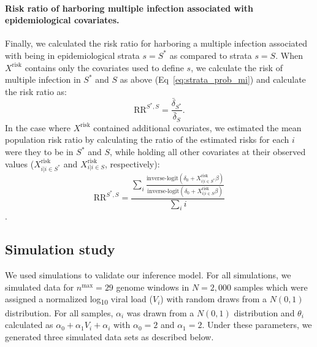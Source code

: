 \documentclass[10pt,letterpaper]{article}
\begin{document}
\paragraph{Risk ratio of harboring multiple infection associated with epidemiological covariates.} Finally, we calculated the risk ratio for harboring a multiple infection associated with being in epidemiological strata $s=S^*$ as compared to strata $s=S$. When $X^\text{risk}$ contains only the covariates used to define $s$, we calculate the risk of multiple infection in $S^*$ and $S$ as above (Eq~\ref{eq:strata_prob_mi}) and calculate the risk ratio as: 
\begin{equation}
    \text{RR}^{S^*,S} = \frac{\bar{\delta}_{S^*}}{\bar{\delta}_{S}}.
\end{equation}
In the case where $X^\text{risk}$ contained additional covariates, we estimated the mean population risk ratio by calculating the ratio of the estimated risks for each $i$ were they to be in $S^*$ and $S$, while holding all other covariates at their observed values ($X^\text{risk}_{i | i \in S^*}$ and $X^\text{risk}_{i | i \in S}$, respectively): 
\begin{equation}
    \text{RR}^{S^*,S} = \frac{\sum_i \frac{\text{inverse-logit} \left( \delta_0 + X^\text{risk}_{i | i \in S^*} \beta \right )}{\text{inverse-logit} \left( \delta_0 + X^\text{risk}_{i | i \in S} \beta \right )}}{\sum_i i}
\end{equation}.

\subsection{Simulation study}
We used simulations to validate our inference model. For all simulations, we simulated data for ${n^{\text{max}}} = 29$ genome windows in $N = 2,000$ samples which were assigned a normalized log\textsubscript{10} viral load ($V_i$) with random draws from a $N(0,1)$ distribution. For all samples, $\alpha_i$ was drawn from a $N(0,1)$ distribution and $\theta_i$ calculated as $\alpha_0 + \alpha_1 V_i + \alpha_i$ with $\alpha_0 = 2$ and $\alpha_1 = 2$. Under these parameters, we generated three simulated data sets as described below.
\end{document}
